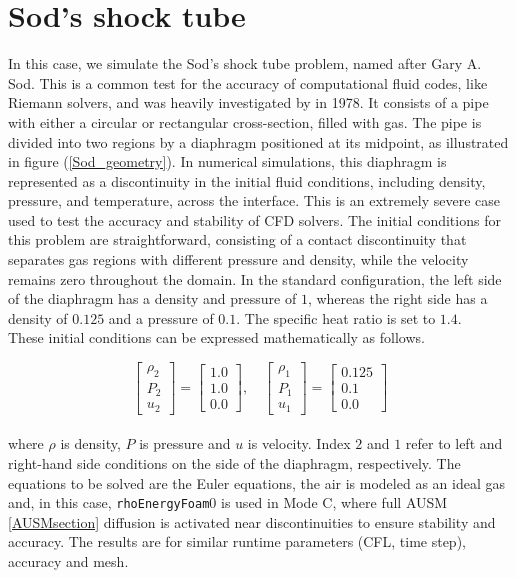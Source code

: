 \documentclass[a5paper]{sapthesis}
\begin{document}
	\section{Sod's shock tube}
	In this case, we simulate the Sod's shock tube problem, named after Gary A. Sod. This is a common test for the accuracy of computational fluid codes, like Riemann solvers, and was heavily investigated by \citet{Sod19781} in 1978. It consists of a pipe with either a circular or rectangular cross-section, filled with gas. The pipe is divided into two regions by a diaphragm positioned at its midpoint, as illustrated in figure (\ref{Sod_geometry}). In numerical simulations, this diaphragm is represented as a discontinuity in the initial fluid conditions, including density, pressure, and temperature, across the interface. This is an extremely severe case used to test the accuracy and stability of CFD solvers. The initial conditions for this problem are straightforward, consisting of a contact discontinuity that separates gas regions with different pressure and density, while the velocity remains zero throughout the domain. In the standard configuration, the left side of the diaphragm has a density and pressure of $1$, whereas the right side has a density of $0.125$ and a pressure of $0.1$. The specific heat ratio is set to $1.4$.\\
	These initial conditions can be expressed mathematically as follows. 
	
	\begin{equation}
		\begin{bmatrix}
			\rho_2\\
			P_2\\
			u_2
		\end{bmatrix}
		=
		\begin{bmatrix}
			1.0\\
			1.0\\
			0.0
		\end{bmatrix},
		\quad
		\begin{bmatrix}
			\rho_1\\
			P_1\\
			u_1
		\end{bmatrix}
		=
		\begin{bmatrix}
			0.125\\
			0.1\\
			0.0
		\end{bmatrix}
	\end{equation}
	\\
	where $\rho$ is density, $P$ is pressure and $u$ is velocity. Index $2$ and $1$ refer to left and right-hand side conditions on the side of the diaphragm, respectively. The equations to be solved are the Euler equations, the air is modeled as an ideal gas and, in this case, \texttt{rhoEnergyFoam}0 is used in Mode C, where full AUSM \ref{AUSMsection} diffusion is activated near discontinuities to ensure stability and accuracy. The results
	are for similar runtime parameters (CFL, time step), accuracy and mesh. 
		
\end{document}
